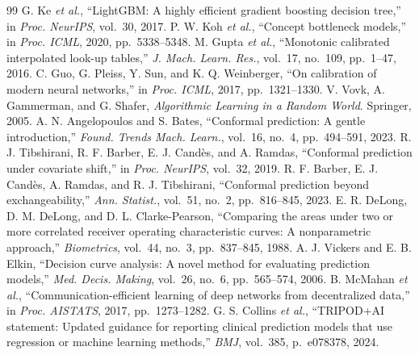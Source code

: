 \documentclass[conference]{IEEEtran}
\begin{document}
\begin{thebibliography}{99}
 G. Ke \emph{et al.}, ``LightGBM: A highly efficient gradient boosting decision tree,'' in \emph{Proc. NeurIPS}, vol.~30, 2017.
 P. W. Koh \emph{et al.}, ``Concept bottleneck models,'' in \emph{Proc. ICML}, 2020, pp.~5338--5348.
 M. Gupta \emph{et al.}, ``Monotonic calibrated interpolated look-up tables,'' \emph{J. Mach. Learn. Res.}, vol.~17, no.~109, pp.~1--47, 2016.
 C. Guo, G. Pleiss, Y. Sun, and K. Q. Weinberger, ``On calibration of modern neural networks,'' in \emph{Proc. ICML}, 2017, pp.~1321--1330.
 V. Vovk, A. Gammerman, and G. Shafer, \emph{Algorithmic Learning in a Random World}. Springer, 2005.
 A. N. Angelopoulos and S. Bates, ``Conformal prediction: A gentle introduction,'' \emph{Found. Trends Mach. Learn.}, vol.~16, no.~4, pp.~494--591, 2023.
 R. J. Tibshirani, R. F. Barber, E. J. Cand{\`e}s, and A. Ramdas, ``Conformal prediction under covariate shift,'' in \emph{Proc. NeurIPS}, vol.~32, 2019.
 R. F. Barber, E. J. Cand{\`e}s, A. Ramdas, and R. J. Tibshirani, ``Conformal prediction beyond exchangeability,'' \emph{Ann. Statist.}, vol.~51, no.~2, pp.~816--845, 2023.
 E. R. DeLong, D. M. DeLong, and D. L. Clarke-Pearson, ``Comparing the areas under two or more correlated receiver operating characteristic curves: A nonparametric approach,'' \emph{Biometrics}, vol.~44, no.~3, pp.~837--845, 1988.
 A. J. Vickers and E. B. Elkin, ``Decision curve analysis: A novel method for evaluating prediction models,'' \emph{Med. Decis. Making}, vol.~26, no.~6, pp.~565--574, 2006.
 B. McMahan \emph{et al.}, ``Communication-efficient learning of deep networks from decentralized data,'' in \emph{Proc. AISTATS}, 2017, pp.~1273--1282.
 G. S. Collins \emph{et al.}, ``TRIPOD+AI statement: Updated guidance for reporting clinical prediction models that use regression or machine learning methods,'' \emph{BMJ}, vol.~385, p.~e078378, 2024.
\end{thebibliography}
\end{document}
